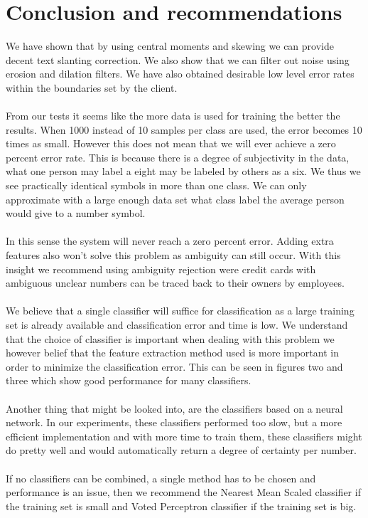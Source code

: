 \documentclass[%
        compressed,
        final,
        notitlepage,
        narroweqnarray,
        inline,
        twoside,
        ]{ieee}
\begin{document}
\section{Conclusion and recommendations}
We have shown that by using central moments and skewing we can provide decent
text slanting correction. We also show that we can filter out noise using
erosion and dilation filters. We have also obtained desirable low level error
rates within the boundaries set by the client.\\\\
From our tests it seems like the more data is used for training the better the
results. When 1000 instead of 10 samples per class are used, the error becomes
10 times as small. However this does not mean that we will ever achieve a zero percent error rate. This is because there is a degree of subjectivity in the data, what one person may label a eight may be labeled by others as a six. We thus we see practically identical symbols in more than one class. We can only approximate with a large enough data set what class label the average person would give to a number symbol. \\\\
In this sense the system will never reach a zero percent error. Adding extra features also won't solve this problem as ambiguity can still occur. With this insight we recommend using ambiguity rejection were credit cards with ambiguous unclear numbers can be traced back to their owners by employees. \\\\
We believe that a single classifier will suffice for classification as a large training set is already available and classification error and time is low. We understand that the choice of classifier is important when dealing with this problem we however belief that the feature extraction method used is more important in order to minimize the classification error. This can be seen in figures two and three which show good performance for many classifiers. \\\\
Another thing that might be looked into, are the classifiers based on a neural
network. In our experiments, these classifiers performed too slow, but a more
efficient implementation and with more time to train them, these classifiers
might do pretty well and would automatically return a degree of certainty per number.\\\\
If no classifiers can be combined, a single method has to be chosen and
performance is an issue, then we recommend the Nearest Mean Scaled classifier if
the training set is small and Voted Perceptron classifier if the training set is
big.

%
%

\printbibliography
\end{document}
